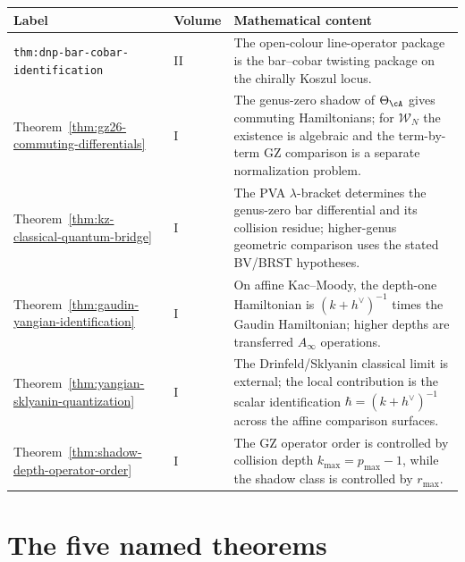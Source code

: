\begin{center}
\renewcommand{\arraystretch}{1.35}
\begin{tabular}{|p{5.2cm}|p{2.0cm}|p{6.4cm}|}
\hline
\textbf{Label} & \textbf{Volume} & \textbf{Mathematical content} \\
\hline\hline
\texttt{thm:dnp-bar-cobar-identification} & II &
The open-colour line-operator package is the bar--cobar twisting
package on the chirally Koszul locus. \\
\hline
Theorem~\ref{thm:gz26-commuting-differentials} & I &
The genus-zero shadow of $\Theta_\cA$ gives commuting Hamiltonians;
for $\mathcal W_N$ the existence is algebraic and the term-by-term
GZ comparison is a separate normalization problem. \\
\hline
Theorem~\ref{thm:kz-classical-quantum-bridge} & I &
The PVA $\lambda$-bracket determines the genus-zero bar differential
and its collision residue; higher-genus geometric comparison uses the
stated BV/BRST hypotheses. \\
\hline
Theorem~\ref{thm:gaudin-yangian-identification} & I &
On affine Kac--Moody, the depth-one Hamiltonian is
$(k+h^\vee)^{-1}$ times the Gaudin Hamiltonian; higher depths are
transferred $A_\infty$ operations. \\
\hline
Theorem~\ref{thm:yangian-sklyanin-quantization} & I &
The Drinfeld/Sklyanin classical limit is external; the local
contribution is the scalar identification
$\hbar=(k+h^\vee)^{-1}$ across the affine comparison surfaces. \\
\hline
Theorem~\ref{thm:shadow-depth-operator-order} & I &
The GZ operator order is controlled by collision depth
$k_{\max}=p_{\max}-1$, while the shadow class is controlled by
$r_{\max}$. \\
\hline
\end{tabular}
\end{center}

\section{The five named theorems}
\label{sec:master-concordance-theorem-surfaces}

